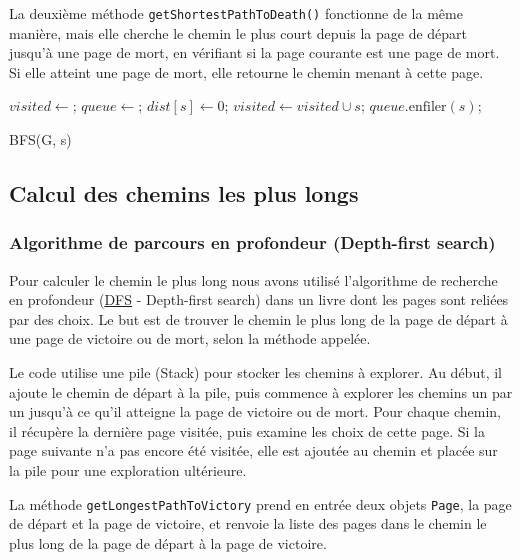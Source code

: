 \documentclass[a4paper,12pt]{article}
\begin{document}
La deuxième méthode \verb|getShortestPathToDeath()| fonctionne de la même manière, mais elle cherche le chemin le plus court depuis la page de départ jusqu'à une page de mort, en vérifiant si la page courante est une page de mort. Si elle atteint une page de mort, elle retourne le chemin menant à cette page. \\ 
\begin{algorithm}[H]


\BlankLine
$visited \gets {}$;
$queue \gets {}$;
$dist[s] \gets 0$;
$visited \gets visited \cup {s}$;
$queue.\mathrm{enfiler}(s)$;


\caption{BFS(G, s)}
\end{algorithm}
\subsection{Calcul des chemins les plus longs}
\subsubsection{Algorithme de parcours en profondeur (Depth-first search)}
Pour calculer le chemin le plus long nous avons utilisé l'algorithme de recherche en profondeur (\href{https://en.wikipedia.org/wiki/Depth-first_search}{DFS} - Depth-first search) dans un livre dont les pages sont reliées par des choix. Le but est de trouver le chemin le plus long de la page de départ à une page de victoire ou de mort, selon la méthode appelée.

Le code utilise une pile (Stack) pour stocker les chemins à explorer. Au début, il ajoute le chemin de départ à la pile, puis commence à explorer les chemins un par un jusqu'à ce qu'il atteigne la page de victoire ou de mort. Pour chaque chemin, il récupère la dernière page visitée, puis examine les choix de cette page. Si la page suivante n'a pas encore été visitée, elle est ajoutée au chemin et placée sur la pile pour une exploration ultérieure.

La méthode \verb|getLongestPathToVictory| prend en entrée deux objets \verb|Page|, la page de départ et la page de victoire, et renvoie la liste des pages dans le chemin le plus long de la page de départ à la page de victoire.
\end{document}
